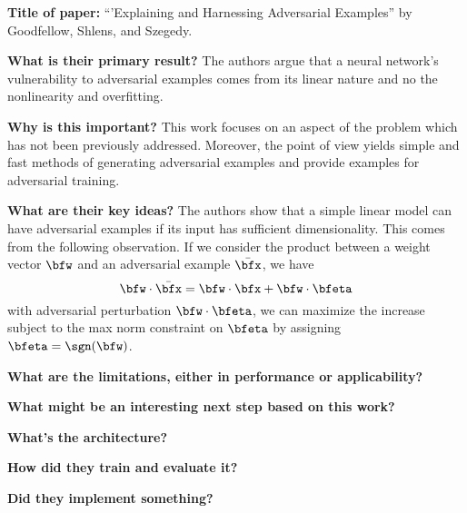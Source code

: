\noindent \textbf{Title of paper:} ``'Explaining and Harnessing Adversarial
Examples'' by Goodfellow, Shlens, and Szegedy. 

\noindent\textbf{What is their primary result?} The authors argue that a neural
network's vulnerability to adversarial examples comes from its linear nature and
no the nonlinearity and overfitting. 

\noindent\textbf{Why is this important?} This work focuses on an aspect of the
problem which has not been previously addressed. Moreover, the point of view
yields simple and fast methods of generating adversarial examples and provide
examples for adversarial training. 

\noindent\textbf{What are their key ideas?} The authors show that a simple
linear model can have adversarial examples if its input has sufficient
dimensionality. This comes from the following observation. If we consider the
product between a weight vector $\bfw$ and an adversarial example $\bar\bfx$, we
have
\[
  \bfw\cdot\bar\bfx=\bfw\cdot\bfx+\bfw\cdot\bfeta
\]
with adversarial perturbation $\bfw\cdot\bfeta$, we can maximize the increase
subject to the max norm constraint on $\bfeta$ by assigning $\bfeta=\sgn(\bfw)$.

\noindent\textbf{What are the limitations, either in performance or applicability?}

\noindent\textbf{What might be an interesting next step based on this work?}

\noindent\textbf{What's the architecture?}

\noindent\textbf{How did they train and evaluate it?}

\noindent\textbf{Did they implement something?}












